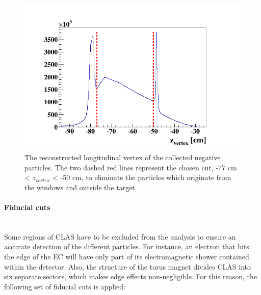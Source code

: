 \begin{itemize}
\begin{figure}[tp]
\centering
\includegraphics[scale=0.43]{fig_analysis/Z_e.png}
\caption{The reconstructed longitudinal vertex of the collected negative particles. The two dashed red lines represent the chosen cut, -77 cm < $z_{vertex}$ < -50 cm, to eliminate the particles which originate from the windows and outside the target.} 
\label{fig:z_cut}
\end{figure}

\paragraph{Fiducial cuts} ~\\
Some regions of CLAS have to be excluded from the analysis to ensure an accurate detection of the different particles. For instance, an electron that hits the edge of the EC will have only part of its electromagnetic shower contained within the detector. Also, the structure of the torus magnet divides CLAS into six separate sectors, which makes edge effects non-negligible. For this reason, the following set of fiducial cuts is applied:      
 

\end{itemize}
